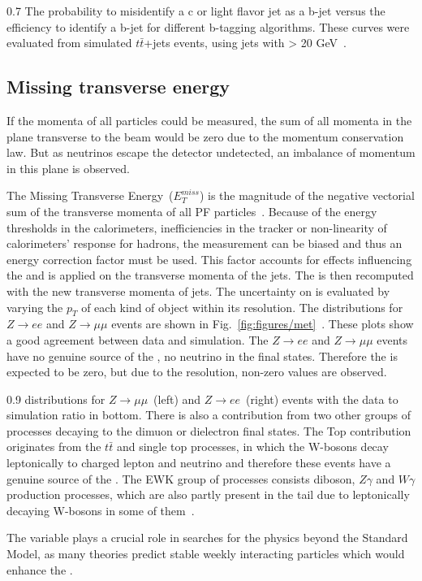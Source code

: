                 {0.7}       %
                 { The probability to misidentify a c or light flavor jet as a b-jet versus the efficiency to identify a b-jet for different b-tagging algorithms. These curves were evaluated from simulated $t\bar{t}$+jets events, using jets with \pt > 20 GeV~\cite{Sirunyan:2017ezt}. }


\subsection{Missing transverse energy}


If the momenta of all particles could be measured, the sum of all momenta in the plane transverse to the beam would be zero due to the momentum conservation law. But as neutrinos escape the detector undetected, an imbalance of momentum in this plane is observed. 

The Missing Transverse Energy~($E_{T}^{miss}$) is the magnitude of the negative vectorial sum of the transverse momenta of all PF particles~\cite{CMS:2016ljj}. Because of the energy thresholds in the calorimeters, inefficiencies in the tracker or non-linearity of calorimeters' response for hadrons, the \MET measurement can be biased and thus an energy correction factor must be used. This factor accounts for effects influencing the \MET and is applied on the transverse momenta of the jets. The \MET is then recomputed with the new transverse momenta of jets. The uncertainty on \MET is evaluated by varying the $p_{T}$ of each kind of object within its resolution. The  \MET  distributions for  $Z \rightarrow ee$ and $Z \rightarrow \mu \mu$ events are shown in Fig.~\ref{fig:figures/met}~\cite{CMS:2016ljj}. These plots show a good agreement between data and simulation. The $Z \rightarrow ee$ and $Z \rightarrow \mu \mu$ events have no genuine source of the \MET , no neutrino in the final states. Therefore the \MET is expected to be zero, but due to the \MET resolution, non-zero values are observed.  


                 {0.9}       %
                 { \MET distributions for $Z \rightarrow \mu \mu$~(left) and $Z \rightarrow ee$~(right) events with the data to simulation ratio in bottom. There is also a contribution from two other groups of processes decaying to the dimuon or dielectron final states. The Top contribution originates from the $t\bar{t}$ and single top processes, in which the W-bosons decay leptonically to charged lepton and neutrino and therefore these events have a genuine source of the \MET. The EWK group of processes consists diboson, $Z\gamma$ and $W\gamma$ production processes, which are also partly present in the \MET tail due to leptonically decaying W-bosons in some of them~\cite{CMS:2016ljj}. }

The \MET variable plays a crucial role in searches for the physics beyond the Standard Model, as many theories predict stable weekly interacting particles which would enhance the \MET.



